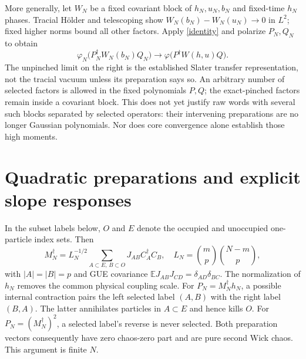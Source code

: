 \documentclass[11pt]{article}
\newcommand{\E}{\mathbb E}
\begin{document}
More generally, let $W_N$ be a fixed covariant block of $h_N,u_N,b_N$
and fixed-time $h_N$ phases. Tracial H\"older and telescoping show
$W_N(b_N)-W_N(u_N)\to0$ in $L^2$; fixed higher norms bound all other
factors. Apply \eqref{identity} and polarize $P_N,Q_N$ to obtain
\begin{equation}\label{block}
 \varphi_N\bigl(P_N^\dagger W_N(b_N)Q_N\bigr)
 \longrightarrow\varphi\bigl(P^\dagger W(h,u)Q\bigr).
\end{equation}
The unpinched limit on the right is the established Slater transfer
representation, not the tracial vacuum unless its preparation says so.
An arbitrary number of selected factors is allowed in the fixed
polynomials $P,Q$; the exact-pinched factors remain inside a covariant
block. This does not yet justify raw words with several such blocks
separated by selected operators: their intervening preparations are
no longer Gaussian polynomials. Nor does core convergence alone
establish those high moments.

\newpage
\section{Quadratic preparations and explicit slope responses}
In the subset labels below, $O$ and $E$ denote the occupied and
unoccupied one-particle index sets. Then
\begin{equation}
 M_N^\dagger=L_N^{-1/2}
 \sum_{A\subset E,\,B\subset O}J_{AB}C_A^\dagger C_B,
 \quad L_N=\binom mp\binom{N-m}p,
\end{equation}
with $|A|=|B|=p$ and GUE covariance
$\E J_{AB}J_{CD}=\delta_{AD}\delta_{BC}$. The normalization of $h_N$
removes the common physical coupling scale.
For $P_N=M_N^\dagger h_N$, a possible internal contraction pairs
the left selected label $(A,B)$ with the right label $(B,A)$.
The latter annihilates particles in $A\subset E$ and hence kills
$O$. For $P_N=(M_N^\dagger)^2$, a selected label's reverse is never
selected. Both preparation vectors consequently have zero chaos-zero
part and are pure second Wick chaos. This argument is finite $N$.
\end{document}
